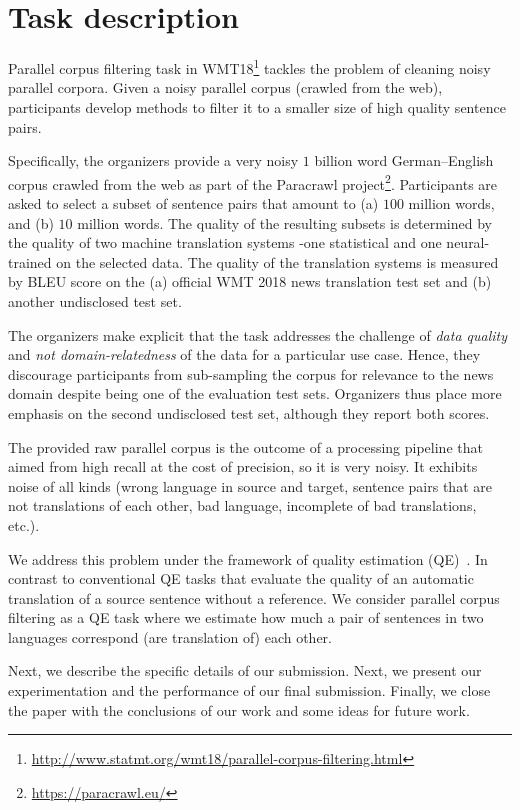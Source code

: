 \section{Task description}

Parallel corpus filtering task in WMT18\footnote{\url{http://www.statmt.org/wmt18/parallel-corpus-filtering.html}} tackles the problem of cleaning noisy parallel corpora. Given a noisy parallel corpus (crawled from the web), participants develop methods to filter it to a smaller size of high quality sentence pairs.

Specifically, the organizers provide a very noisy $1$ billion word German--English corpus crawled from the web as part of the Paracrawl project\footnote{\url{https://paracrawl.eu/}}. Participants are asked to select a subset of sentence pairs that amount to (a) $100$ million words, and (b) $10$ million words. The quality of the resulting subsets is determined by the quality of two machine translation systems -one statistical and one neural- trained on the selected data. The quality of the translation systems is measured by BLEU score on the (a) official WMT 2018 news translation test set and (b) another undisclosed test set.

The organizers make explicit that the task addresses the challenge of \emph{data quality} and \emph{not domain-relatedness} of the data for a particular use case. Hence, they discourage participants from sub-sampling the corpus for relevance to the news domain despite being one of the evaluation test sets. Organizers thus place more emphasis on the second undisclosed test set, although they report both scores.

The provided raw parallel corpus is the outcome of a processing pipeline that aimed from high recall at the cost of precision, so it is very noisy. It exhibits noise of all kinds (wrong language in source and target, sentence pairs that are not translations of each other, bad language, incomplete of bad translations, etc.).

We address this problem under the framework of quality estimation (QE)~\cite{Blatz04}. In contrast to conventional QE tasks that evaluate the quality of an automatic translation of a source sentence without a reference. We consider parallel corpus filtering as a QE task where we estimate how much a pair of sentences in two languages correspond (are translation of) each other. 

Next, we describe the specific details of our submission. Next, we present our experimentation and the performance of our final submission. Finally, we close the paper with the conclusions of our work and some ideas for future work.